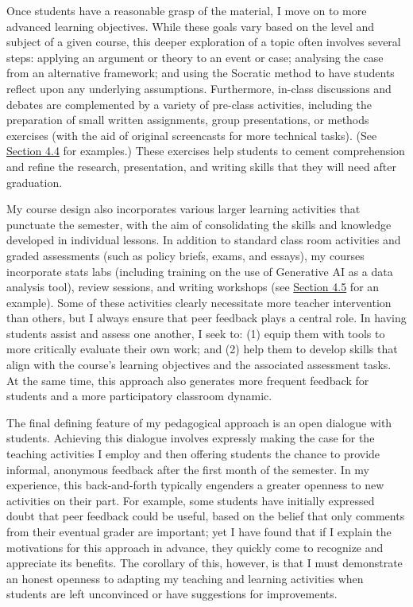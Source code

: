 \documentclass[11pt]{article}
\begin{document}
Once students have a reasonable grasp of the material, I move on to more advanced learning objectives. While these goals vary based on the level and subject of a given course, this deeper exploration of a topic often involves several steps: applying an argument or theory to an event or case; analysing the case from an alternative framework; and using the Socratic method to have students reflect upon any underlying assumptions. Furthermore, in-class discussions and debates are complemented by a variety of pre-class activities, including the preparation of small written assignments, group presentations, or methods exercises (with the aid of original screencasts for more technical tasks). (See \hyperref[sec:tutorials]{Section 4.4} for examples.) These exercises help students to cement comprehension and refine the research, presentation, and writing skills that they will need after graduation.
    
My course design also incorporates various larger learning activities that punctuate the semester, with the aim of consolidating the skills and knowledge developed in individual lessons. In addition to standard class room activities and graded assessments (such as policy briefs, exams, and essays), my courses incorporate stats labs (including training on the use of Generative AI as a data analysis tool), review sessions, and writing workshops (see \hyperref[sec:workshop]{Section 4.5} for an example). Some of these activities clearly necessitate more teacher intervention than others, but I always ensure that peer feedback plays a central role. In having students assist and assess one another, I seek to: (1) equip them with tools to more critically evaluate their own work; and (2) help them to develop skills that align with the course's learning objectives and the associated assessment tasks. At the same time, this approach also generates more frequent feedback for students and a more participatory classroom dynamic.
    
The final defining feature of my pedagogical approach is an open dialogue with students. Achieving this dialogue involves expressly making the case for the teaching activities I employ and then offering students the chance to provide informal, anonymous feedback after the first month of the semester. In my experience, this back-and-forth typically engenders a greater openness to new activities on their part. For example, some students have initially expressed doubt that peer feedback could be useful, based on the belief that only comments from their eventual grader are important; yet I have found that if I explain the motivations for this approach in advance, they quickly come to recognize and appreciate its benefits. The corollary of this, however, is that I must demonstrate an honest openness to adapting my teaching and learning activities when students are left unconvinced or have suggestions for improvements. 
\end{document}
